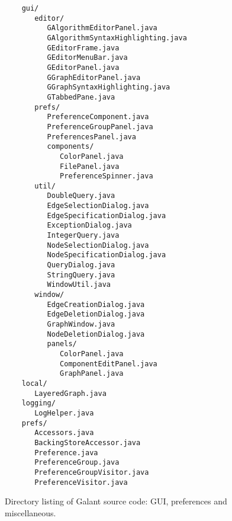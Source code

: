 \begin{figure}

  \begin{center}
      \begin{minipage}{4in}
  \small
\begin{verbatim}
    gui/
       editor/
          GAlgorithmEditorPanel.java
          GAlgorithmSyntaxHighlighting.java
          GEditorFrame.java
          GEditorMenuBar.java
          GEditorPanel.java
          GGraphEditorPanel.java
          GGraphSyntaxHighlighting.java
          GTabbedPane.java
       prefs/
          PreferenceComponent.java
          PreferenceGroupPanel.java
          PreferencesPanel.java
          components/
             ColorPanel.java
             FilePanel.java
             PreferenceSpinner.java
       util/
          DoubleQuery.java
          EdgeSelectionDialog.java
          EdgeSpecificationDialog.java
          ExceptionDialog.java
          IntegerQuery.java
          NodeSelectionDialog.java
          NodeSpecificationDialog.java
          QueryDialog.java
          StringQuery.java
          WindowUtil.java
       window/
          EdgeCreationDialog.java
          EdgeDeletionDialog.java
          GraphWindow.java
          NodeDeletionDialog.java
          panels/
             ColorPanel.java
             ComponentEditPanel.java
             GraphPanel.java
    local/
       LayeredGraph.java
    logging/
       LogHelper.java
    prefs/
       Accessors.java
       BackingStoreAccessor.java
       Preference.java
       PreferenceGroup.java
       PreferenceGroupVisitor.java
       PreferenceVisitor.java
\end{verbatim}
      \end{minipage}
  \end{center}

  \medskip
  \caption{Directory listing of Galant source code: GUI, preferences and miscellaneous.}
  \label{fig:directory_listing_}
\end{figure}

